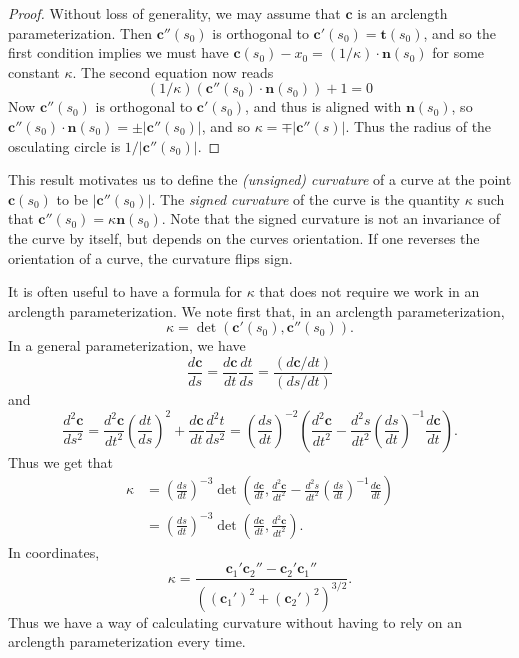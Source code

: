 \begin{proof}
    Without loss of generality, we may assume that $\mathbf{c}$ is an arclength parameterization. Then $\mathbf{c}''(s_0)$ is orthogonal to $\mathbf{c}'(s_0) = \mathbf{t}(s_0)$, and so the first condition implies we must have $\mathbf{c}(s_0) - x_0 = (1/\kappa) \cdot \mathbf{n}(s_0)$ for some constant $\kappa$. The second equation now reads
    \[ (1/\kappa) \left( \mathbf{c}''(s_0) \cdot \mathbf{n}(s_0) \right) + 1 = 0 \]
    Now $\mathbf{c}''(s_0)$ is orthogonal to $\mathbf{c}'(s_0)$, and thus is aligned with $\mathbf{n}(s_0)$, so $\mathbf{c}''(s_0) \cdot \mathbf{n}(s_0) = \pm |\mathbf{c}''(s_0)|$, and so $\kappa = \mp |\mathbf{c}''(s)|$. Thus the radius of the osculating circle is $1/|\mathbf{c}''(s_0)|$.
\end{proof}

This result motivates us to define the \emph{(unsigned) curvature} of a curve at the point $\mathbf{c}(s_0)$ to be $|\mathbf{c}''(s_0)|$. The \emph{signed curvature} of the curve is the quantity $\kappa$ such that $\mathbf{c}''(s_0) = \kappa \mathbf{n}(s_0)$. Note that the signed curvature is not an invariance of the curve by itself, but depends on the curves orientation. If one reverses the orientation of a curve, the curvature flips sign.

It is often useful to have a formula for $\kappa$ that does not require we work in an arclength parameterization. We note first that, in an arclength parameterization,
%
\[ \kappa = \det(\mathbf{c}'(s_0), \mathbf{c}''(s_0)). \]
%
In a general parameterization, we have
%
\[ \frac{d\mathbf{c}}{ds} = \frac{d\mathbf{c}}{dt} \frac{dt}{ds} = \frac{(d\mathbf{c}/dt)}{(ds/dt)} \]
%
and
%
\[ \frac{d^2\mathbf{c}}{ds^2} = \frac{d^2\mathbf{c}}{dt^2} \left( \frac{dt}{ds} \right)^2 + \frac{d\mathbf{c}}{dt} \frac{d^2t}{ds^2} = \left( \frac{ds}{dt} \right)^{-2} \left( \frac{d^2 \mathbf{c}}{dt^2} - \frac{d^2 s}{dt^2} \left( \frac{ds}{dt} \right)^{-1} \frac{d \mathbf{c}}{dt} \right). \]
%
Thus we get that
%
\begin{align*}
    \kappa &= \left( \frac{ds}{dt} \right)^{-3} \det \left( \frac{d\mathbf{c}}{dt}, \frac{d^2 \mathbf{c}}{dt^2} - \frac{d^2 s}{dt^2} \left( \frac{ds}{dt} \right)^{-1}  \frac{d \mathbf{c}}{dt} \right)\\
    &= \left( \frac{ds}{dt} \right)^{-3} \det \left( \frac{d\mathbf{c}}{dt}, \frac{d^2 \mathbf{c}}{dt^2} \right).
\end{align*}
%
In coordinates,
%
\[ \kappa = \frac{\mathbf{c}_1' \mathbf{c}_2'' - \mathbf{c}_2' \mathbf{c}_1''}{((\mathbf{c}_1')^2 + (\mathbf{c}_2')^2)^{3/2}}. \]
%
Thus we have a way of calculating curvature without having to rely on an arclength parameterization every time.

